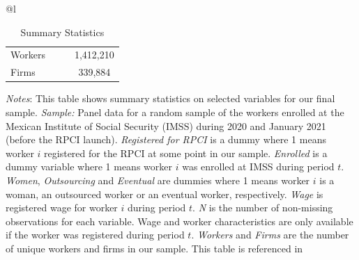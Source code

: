 \documentclass[oneside,11pt]{article}
\begin{document}
\begin{table}[H]
\footnotesize
\centering
\begin{threeparttable}
\centering
\caption{Summary Statistics\label{tab:summary_stats_rpci}}

\begin{tabular}[t]{@{}l}
\toprule
\toprule
\begin{tabular}[t]{lccc}

\midrule
Workers & & & 1,412,210\\
Firms & & & 339,884\\
\end{tabular}

\tabularnewline 
\bottomrule
\bottomrule

\end{tabular}

\begin{tablenotes}
\setlength{}
\scriptsize
\item \textit{Notes}: This table shows summary statistics on selected variables for our final sample. \textit{Sample:} Panel data for a random sample of the workers enrolled at the Mexican Institute of Social Security (IMSS) during 2020 and January 2021 (before the RPCI launch). \textit{Registered for RPCI} is a dummy where 1 means worker $i$ registered for the RPCI at some point in our sample. \textit{Enrolled} is a dummy variable where 1 means worker $i$ was enrolled at IMSS during period $t$. \textit{Women}, \textit{Outsourcing} and \textit{Eventual} are dummies where 1 means worker $i$ is a woman, an outsourced worker or an eventual worker, respectively. \textit{Wage} is registered wage for worker $i$ during period $t$. \textit{N} is the number of non-missing observations for each variable. Wage and worker characteristics are only available if the worker was registered during period $t$. \textit{Workers} and \textit{Firms} are the number of unique workers and firms in our sample. This table is referenced in %
\end{tablenotes}
\end{threeparttable}
\end{table}

\clearpage
\end{document}
